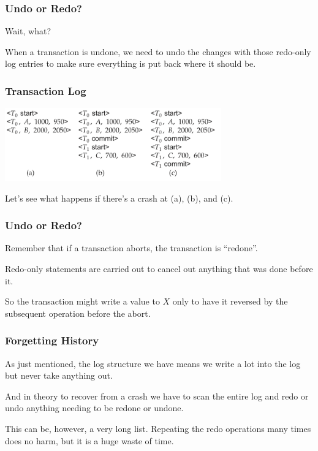 \begin{frame}
\frametitle{Undo or Redo?}
Wait, what? 

When a transaction is undone, we need to undo the changes with those redo-only log entries to make sure everything is put back where it should be.

\end{frame}


\begin{frame}
\frametitle{Transaction Log}

\begin{center}
	\includegraphics[width=0.7\textwidth]{images/transaction-log}
\end{center}

Let's see what happens if there's a crash at (a), (b), and (c).

\end{frame}

\begin{frame}
\frametitle{Undo or Redo?}

Remember that if a transaction aborts, the transaction is ``redone''. 

Redo-only statements are carried out to cancel out anything that was done before it. 

So the transaction might write a value to $X$ only to have it reversed by the subsequent operation before the abort.

\end{frame}


\begin{frame}
\frametitle{Forgetting History}

As just mentioned, the log structure we have means we write a lot into the log but never take anything out. 

And in theory to recover from a crash we have to scan the entire log and redo or undo anything needing to be redone or undone. 

This can be, however, a very long list. Repeating the redo operations many times does no harm, but it is a huge waste of time.

\end{frame}

